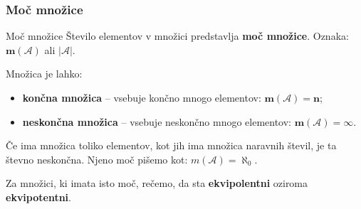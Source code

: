         \begin{frame}
            \frametitle{Moč množice}

            \begin{alertblock}{Moč množice}
                Število elementov v množici predstavlja \textbf{moč množice}. 
                Oznaka: $\mathbf{m(\mathcal{A})}$ ali $\mathbf{|\mathcal{A}|}$.
            \end{alertblock}

            \begin{alertblock}{}
                Množica je lahko:
                \begin{itemize}
                    \item \textbf{končna množica} -- vsebuje končno mnogo elementov: $\mathbf{m(\mathcal{A})=n}$;
                    \item \textbf{neskončna množica} -- vsebuje neskončno mnogo elementov: $\mathbf{m(\mathcal{A})=\infty}$.
                \end{itemize}
            \end{alertblock}

            \begin{block}{}
                Če ima množica toliko elementov, kot jih ima množica naravnih števil, je ta števno 
                neskončna.
                Njeno moč pišemo kot: $m(\mathcal{A})=\aleph_0$. 
            \end{block}

            \begin{alertblock}{}
                Za množici, ki imata isto moč, rečemo, da sta \textbf{ekvipolentni} oziroma \textbf{ekvipotentni}.
            \end{alertblock}

        \end{frame}

